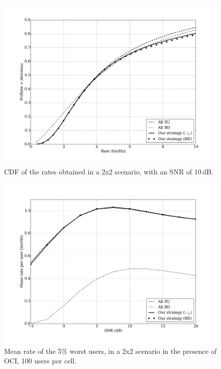 \begin{figure}[t]
\centering
\includegraphics[width=0.75\columnwidth]{./12.simple_threshold_scheduling/img/cdf_02x02_s20_100user_bd} \caption{CDF of the rates obtained in a 2x2 scenario, with an SNR of $10$\,dB.}
\label{fig:cdf_snr10}
\end{figure}

\begin{figure}[t]
\centering
\includegraphics[width=0.75\columnwidth]{./12.simple_threshold_scheduling/img/mean_rate_005_worst_02x02_100user_bd} \caption{Mean rate of the 5\% worst users, in a 2x2 scenario in the presence of OCI, 100 users per cell.}
\label{fig:worst_rate}
\end{figure}
